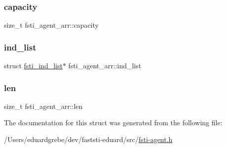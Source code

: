 \subsubsection{\texorpdfstring{capacity}{capacity}}
{\footnotesize\ttfamily size\+\_\+t fsti\+\_\+agent\+\_\+arr\+::capacity}

\mbox{\label{structfsti__agent__arr_ae71448f56b3474ebeb7efecab3651968}} 
\subsubsection{\texorpdfstring{ind\+\_\+list}{ind\_list}}
{\footnotesize\ttfamily struct \mbox{\hyperlink{structfsti__ind__list}{fsti\+\_\+ind\+\_\+list}}$\ast$ fsti\+\_\+agent\+\_\+arr\+::ind\+\_\+list}

\mbox{\label{structfsti__agent__arr_a7a3aad9a85b02c5bdeac139912f2dd94}} 
\subsubsection{\texorpdfstring{len}{len}}
{\footnotesize\ttfamily size\+\_\+t fsti\+\_\+agent\+\_\+arr\+::len}



The documentation for this struct was generated from the following file\+:\begin{DoxyCompactItemize}
\item 
/\+Users/eduardgrebe/dev/faststi-\/eduard/src/\mbox{\hyperlink{fsti-agent_8h}{fsti-\/agent.\+h}}\end{DoxyCompactItemize}
